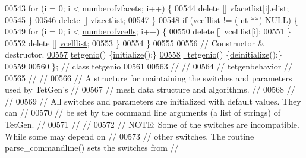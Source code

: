 \begin{DoxyCode}
00543       \textcolor{keywordflow}{for} (i = 0; i < \hyperlink{classtetgenio_a054e5d022a3e6c6cb490975487390bba}{numberofvfacets}; i++) \{
00544         \textcolor{keyword}{delete} [] vfacetlist[i].\hyperlink{structtetgenio_1_1vorofacet_a7dc623ea5f4a6006fcc20b2bc8a1f560}{elist};
00545       \}
00546       \textcolor{keyword}{delete} [] \hyperlink{classtetgenio_a14c253eb433eecf874ab4b6fba68c683}{vfacetlist};
00547     \}
00548     \textcolor{keywordflow}{if} (vcelllist != (\textcolor{keywordtype}{int} **) NULL) \{
00549       \textcolor{keywordflow}{for} (i = 0; i < \hyperlink{classtetgenio_afbc917d5c352817d0668170f71bb8404}{numberofvcells}; i++) \{
00550         \textcolor{keyword}{delete} [] vcelllist[i];
00551       \}
00552       \textcolor{keyword}{delete} [] \hyperlink{classtetgenio_ac39235a7d29d7786e8471e9c3b88d292}{vcelllist};
00553     \}
00554   \}
00555 
00556   \textcolor{comment}{// Constructor & destructor.}
\hypertarget{tetgen_8h_source.tex_l00557}{}\hyperlink{classtetgenio_ad1fbb1c5d4dae0afc09b40eb498ca275}{00557}   \hyperlink{classtetgenio_ad1fbb1c5d4dae0afc09b40eb498ca275}{tetgenio}() \{\hyperlink{classtetgenio_ac164a365a6a479bb31cd40443f5bd989}{initialize}();\}
\hypertarget{tetgen_8h_source.tex_l00558}{}\hyperlink{classtetgenio_af54f8705453a9421aafd500ed9435d2a}{00558}   \hyperlink{classtetgenio_af54f8705453a9421aafd500ed9435d2a}{~tetgenio}() \{\hyperlink{classtetgenio_afcc5a8855570b36717070f3f47e3ef2a}{deinitialize}();\}
00559 
00560 \}; \textcolor{comment}{// class tetgenio}
00561 
00563 \textcolor{comment}{//                                                                           //}
00564 \textcolor{comment}{// tetgenbehavior                                                            //}
00565 \textcolor{comment}{//                                                                           //}
00566 \textcolor{comment}{// A structure for maintaining the switches and parameters used by TetGen's  //}
00567 \textcolor{comment}{// mesh data structure and algorithms.                                       //}
00568 \textcolor{comment}{//                                                                           //}
00569 \textcolor{comment}{// All switches and parameters are initialized with default values. They can //}
00570 \textcolor{comment}{// be set by the command line arguments (a list of strings) of TetGen.       //}
00571 \textcolor{comment}{//                                                                           //}
00572 \textcolor{comment}{// NOTE: Some of the switches are incompatible. While some may depend on     //}
00573 \textcolor{comment}{// other switches.  The routine parse\_commandline() sets the switches from   //}

\end{DoxyCode}
